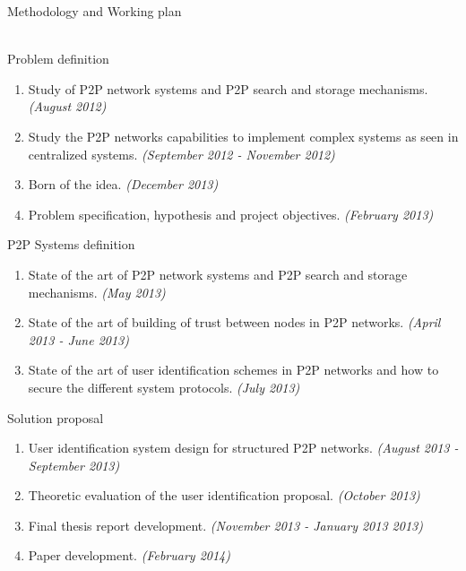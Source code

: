 \documentclass[12pt]{beamer}
\renewcommand{\frametitle}[1]{\vspace{0.2cm}\begin{huge}#1\end{huge}\\}
\begin{document}
\begin{frame}[allowframebreaks]
\frametitle{Methodology and Working plan}
\scriptsize
{} Problem definition
\begin{enumerate}
    \item Study of P2P network systems and P2P search and storage mechanisms.
          \emph{(August 2012)}
    \item Study the P2P networks capabilities to implement complex systems as
          seen in centralized systems.
          \emph{(September 2012 - November 2012)}
    \item Born of the idea.
          \emph{(December 2013)}
    \item Problem specification, hypothesis and project objectives.
          \emph{(February 2013)}
\end{enumerate}

 P2P Systems definition
\begin{enumerate}
    \item State of the art of P2P network systems and P2P search and storage mechanisms.
          \emph{(May 2013)}
    \item State of the art of building of trust between nodes in P2P networks.
          \emph{(April 2013 - June 2013)}
    \item State of the art of user identification schemes in P2P networks and
          how to secure the different system protocols.
          \emph{(July 2013)}
\end{enumerate}

 Solution proposal
\begin{enumerate}
    \item User identification system design for structured P2P networks.
          \emph{(August 2013 - September 2013)}
    \item Theoretic evaluation of the user identification proposal.
          \emph{(October 2013)}
    \item Final thesis report development.
          \emph{(November 2013 - January 2013 2013)}
    \item Paper development.
          \emph{(February 2014)}
\end{enumerate}
\normalsize
\end{frame}

  
\end{document}
